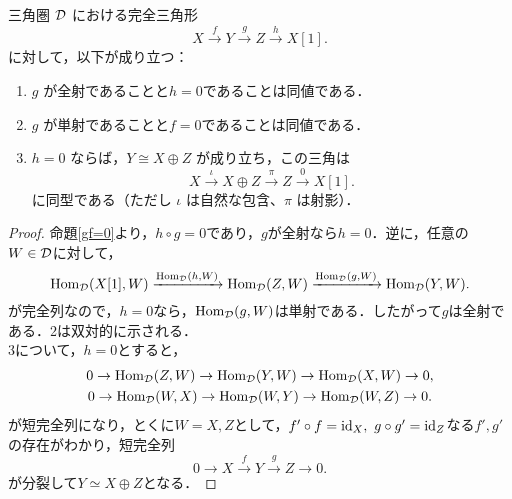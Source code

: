 \begin{cor}
三角圏 ${\mathcal D}$ における完全三角形
\[
X \xrightarrow{f} Y \xrightarrow{g} Z \xrightarrow{h} X[1].
\]
に対して，以下が成り立つ：

\begin{enumerate}
  \item $g$ が全射であることと$h = 0$であることは同値である．
  \item $g$ が単射であることと$f = 0$であることは同値である．
  \item $h = 0$ ならば，$Y \cong X \oplus Z$ が成り立ち，この三角は
  \[
  X \xrightarrow{\iota} X \oplus Z \xrightarrow{\pi} Z \xrightarrow{0} X[1].
  \]
  に同型である（ただし $\iota$ は自然な包含、$\pi$ は射影）．
\end{enumerate}
\end{cor}
\begin{proof}
	命題\ref{gf=0}より，$h\circ g = 0$であり，$g$が全射なら$h=0$．逆に，任意の$W\in{\mathcal D}$に対して，
\[
	\operatorname{\mathrm{Hom}}_{{\mathcal D}}(X[1],W)\xrightarrow{\operatorname{\mathrm{Hom}}_{{\mathcal D}}(h,W)}\operatorname{\mathrm{Hom}}_{{\mathcal D}}(Z,W)\xrightarrow{\operatorname{\mathrm{Hom}}_{{\mathcal D}}(g,W)}\operatorname{\mathrm{Hom}}_{{\mathcal D}}(Y,W).
\]	
が完全列なので，$h=0$なら，$\operatorname{\mathrm{Hom}}_{{\mathcal D}}(g,W)$は単射である．したがって$g$は全射である．2は双対的に示される．\\
3について，$h=0$とすると，
\begin{gather*}
	0\rightarrow\operatorname{\mathrm{Hom}}_{{\mathcal D}}(Z,W)\rightarrow\operatorname{\mathrm{Hom}}_{{\mathcal D}}(Y,W)\rightarrow\operatorname{\mathrm{Hom}}_{{\mathcal D}}(X,W)\rightarrow 0,\\
	0\rightarrow\operatorname{\mathrm{Hom}}_{{\mathcal D}}(W,X)\rightarrow\operatorname{\mathrm{Hom}}_{{\mathcal D}}(W,Y)\rightarrow\operatorname{\mathrm{Hom}}_{{\mathcal D}}(W,Z)\rightarrow 0.
\end{gather*}
が短完全列になり，とくに$W=X,Z$として，$f'\circ f =\mathrm{id}_X,\ g\circ g'=\mathrm{id}_Z$なる$f',g'$の存在がわかり，短完全列
\[
0\rightarrow X \xrightarrow{f} Y \xrightarrow{g} Z\rightarrow 0 .
\]
が分裂して$Y\simeq X\oplus Z$となる．
\end{proof}

